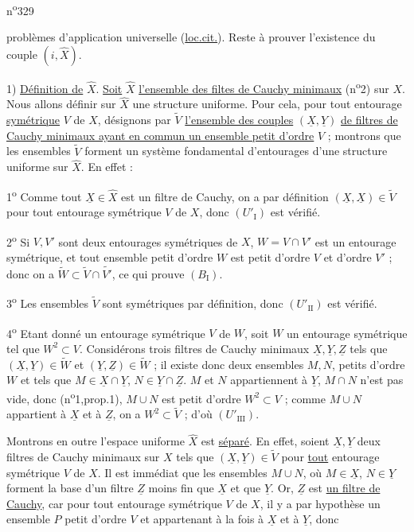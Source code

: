 \hfill n\textsuperscript{o}329

problèmes d'application universelle (\uline{loc.cit.}). Reste à prouver l'existence du couple $(i,\hat X)$.

1) \uline{Définition de} $\hat X$. \uline{Soit} $\hat X$ \uline{l'ensemble des filtes de Cauchy minimaux} (n\textsuperscript{o}2) sur $X$. Nous allons définir sur $\hat X$ une structure uniforme. Pour cela, pour tout entourage \uline{symétrique} $V$ de $X$, désignons par $\tilde V$ \uline{l'ensemble des couples} $(\underline X,\underline Y)$ \uline{de filtres de Cauchy minimaux ayant en commun un ensemble petit d'ordre} $V$ ; montrons que les ensembles $\tilde V$ forment un système fondamental d'entourages d'une structure uniforme sur $\hat X$. En effet :

1\textsuperscript{o} Comme tout $\underline X\in\hat X$ est un filtre de Cauchy, on a par définition $(\underline X,\underline X)\in\tilde V$ pour tout entourage symétrique $V$ de $X$, donc $(U'_{\mathrm I})$ est vérifié.

2\textsuperscript{o} Si $V,V'$ sont deux entourages symétriques de $X$, $W=V\cap V'$ est un entourage symétrique, et tout ensemble petit d'ordre $W$ est petit d'ordre $V$ et d'ordre $V'$ ; donc on a $\tilde W\subset\tilde V\cap\tilde{V'}$, ce qui prouve $(B_{\mathrm I})$.

3\textsuperscript{o} Les ensembles $\tilde V$ sont symétriques par définition, donc $(U'_{\mathrm{II}})$ est vérifié.

4\textsuperscript{o} Etant donné un entourage symétrique $V$ de $W$, soit $W$ un entourage symétrique tel que $W^2\subset V$. Considérons trois filtres de Cauchy minimaux $\underline X,\underline Y,\underline Z$ tels que $(\underline X,\underline Y)\in\tilde W$ et $(\underline Y,\underline Z)\in\tilde W$ ; il existe donc deux ensembles $M,N$, petits d'ordre $W$ et tels que $M\in\underline X\cap\underline Y$, $N\in\underline Y\cap\underline Z$.  $M$ et $N$ appartiennent à $\underline Y$, $M\cap N$ n'est pas vide, donc (n\textsuperscript{o}1,prop.1), $M\cup N$ est petit d'ordre $W^2\subset V$ ; comme $M\cup N$ appartient à $\underline X$ et à $\underline Z$, on a $W^2\subset\tilde V$ ; d'où $(U'_{\mathrm{III}})$.

Montrons en outre l'espace uniforme $\hat X$ est \uline{séparé}. En effet, soient $\underline X,\underline Y$ deux filtres de Cauchy minimaux sur $X$ tels que $(\underline X,\underline Y)\in\tilde V$ pour \uline{tout} entourage symétrique $V$ de $X$. Il est immédiat que les ensembles $M\cup N$, où $M\in\underline X$, $N\in\underline Y$ forment la base d'un filtre $\underline Z$ moins fin que $\underline X$ et que $\underline Y$. Or, $\underline Z$ est \uline{un filtre de Cauchy}, car pour tout entourage symétrique $V$ de $X$, il y a par hypothèse un ensemble $P$ petit d'ordre $V$ et appartenant à la fois à $\underline X$ et à $\underline Y$, donc



